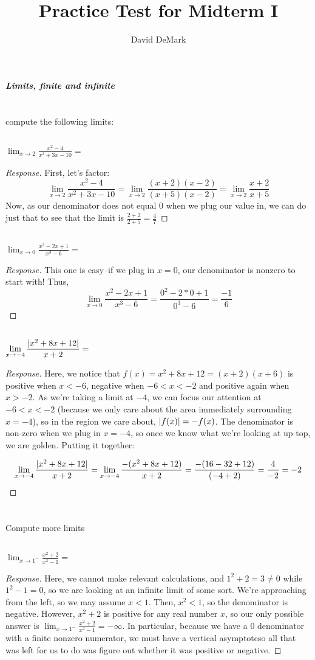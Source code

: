 \documentclass[english]{article}
\title{Practice Test for Midterm I}
\author{David DeMark}
\date{\due}
\DeclarePairedDelimiter\abs{\lvert}{\rvert}%
\newcommand{\prob}[1]{\setcounter{section}{#1-1}\section{}}
\newcommand{\prt}[1]{\setcounter{subsection}{#1-1}\subsection{}}
\theoremstyle{remark}
\theoremstyle{definition}
\newcommand{\resp}[1]{\begin{proof}[Response]{#1}\end{proof}}
\begin{document}
	\maketitle

\begin{center}{\LARGE\textbf{\emph{Limits, finite and infinite}}}\end{center}
	\prob{1} compute the following limits:
	\prt{1} $\displaystyle{\lim_{x\to 2} \frac{x^2-4}{x^2+3x-10}=}$
	\begin{proof}[Response]
First, let's factor: 
$${\lim_{x\to 2} \frac{x^2-4}{x^2+3x-10}=\lim_{x\to 2}\frac{(x+2)(x-2)}{(x+5)(x-2)}}=\lim_{x\to 2}\frac{x+2}{x+5}$$
Now, as our denominator does not equal $0$ when we plug our value in, we can do just that to see that the limit is $\frac{2+2}{2+5}=\frac{4}{7}$
	\end{proof}
	\prt{2} $\displaystyle{\lim_{x\to 0} \frac{x^2-2x+1}{x^3-6}=}$
	\begin{proof}[Response]
		This one is easy--if we plug in $x=0$, our denominator is nonzero to start with! Thus, $$\lim_{x\to 0} \frac{x^2-2x+1}{x^3-6}=\frac{0^2-2*0+1}{0^3-6}=\frac{-1}{6}$$
		\end{proof}
	\prt{3} $\displaystyle{\lim_{x\to -4} \frac{\abs{x^2+8x+12}}{x+2}=}$\begin{proof}[Response]
	Here, we notice that $f(x)=x^2+8x+12=(x+2)(x+6)$ is positive when $x<-6$, negative when $-6<x<-2$ and positive again when $x>-2$. As we're taking a limit at $-4$, we can focus our attention at $-6<x<-2$ (because we only care about the area immediately surrounding $x=-4$), so in the region we care about, $\abs{f(x)}=-f(x)$. The denominator is non-zero when we plug in $x=-4$, so once we know what we're looking at up top, we are golden. Putting it together:
	
	$$\lim_{x\to -4} \frac{\abs{x^2+8x+12}}{x+2}=\lim_{x\to -4} \frac{-(x^2+8x+12)}{x+2}=\frac{-(16-32+12)}{(-4+2)}=\frac{4}{-2}=-2$$\end{proof}
	\newpage
	\prob{2} Compute more limits
	\prt{1} $\displaystyle{\lim_{x\to 1^-} \frac{x^2+2}{x^2-1}=}$\resp{Here, we cannot make relevant calculations, and $1^2+2=3\neq 0$ while $1^2-1=0$, so we are looking at an infinite limit of some sort. We're approaching from the left, so we may assume $x<1$. Then, $x^2<1$, so the denominator is negative. However, $x^2+2$ is positive for any real number $x$, so our only possible answer is $\displaystyle{\lim_{x\to 1^-} \frac{x^2+2}{x^2-1}=-\infty}$. In particular, because we have a $0$ denominator with a finite nonzero numerator, we must have a vertical asymptote\textemdash so all that was left for us to do was figure out whether it was positive or negative.}
	
\end{document}
